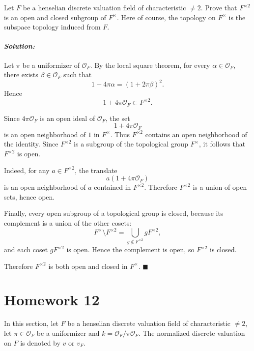 \documentclass[12pt, a4paper]{article}
\newenvironment{solution}
  {\paragraph{\textit{Solution:}}\par\medskip}
  {\hfill$\blacksquare$\vspace{0.1cm}}
\begin{document}
Let $F$ be a henselian discrete valuation field of characteristic $\neq 2$. Prove that $F^{\times 2}$ is an open and closed subgroup of $F^{\times}$. Here of course, the topology on $F^{\times}$ is the subspace topology induced from $F$.
\begin{solution}
Let \(\pi\) be a uniformizer of \(\mathcal O_F\). By the local square theorem,
for every \(\alpha\in\mathcal O_F\), there exists \(\beta\in\mathcal O_F\) such
that
\[
1+4\pi\alpha=(1+2\pi\beta)^2.
\]
Hence
\[
1+4\pi\mathcal O_F\subset F^{\times 2}.
\]

Since \(4\pi\mathcal O_F\) is an open ideal of \(\mathcal O_F\), the set
\[
1+4\pi\mathcal O_F
\]
is an open neighborhood of \(1\) in \(F^\times\). Thus \(F^{\times 2}\) contains
an open neighborhood of the identity. Since \(F^{\times 2}\) is a subgroup of
the topological group \(F^\times\), it follows that \(F^{\times 2}\) is open.

Indeed, for any \(a\in F^{\times 2}\), the translate
\[
a(1+4\pi\mathcal O_F)
\]
is an open neighborhood of \(a\) contained in \(F^{\times 2}\). Therefore
\(F^{\times 2}\) is a union of open sets, hence open.

Finally, every open subgroup of a topological group is closed, because its
complement is a union of the other cosets:
\[
F^\times\setminus F^{\times 2}
=
\bigcup_{g\notin F^{\times 2}} gF^{\times 2},
\]
and each coset \(gF^{\times 2}\) is open. Hence the complement is open, so
\(F^{\times 2}\) is closed.

Therefore \(F^{\times 2}\) is both open and closed in \(F^\times\).
\end{solution}


\section*{Homework 12}

In this section, let $F$ be a henselian discrete valuation field of
characteristic $\neq 2$, let $\pi\in \mathcal O_F$ be a uniformizer and
$k=\mathcal O_F/\pi\mathcal O_F$. The normalized discrete valuation on $F$ is
denoted by $v$ or $v_F$.
\end{document}
